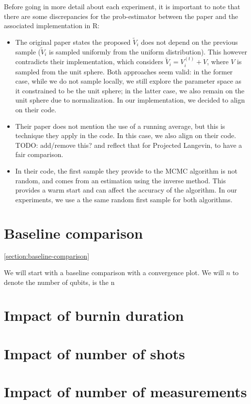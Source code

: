 \documentclass[12pt]{memoir}
\begin{document}
Before going in more detail about each experiment, it is important to note that there are some discrepancies for the prob-estimator between the paper and the associated implementation in R:
\begin{itemize}
\item The original paper states the proposed $\tilde V_i$ does not depend on the previous sample ($\tilde V_i$ is sampled uniformly from the uniform distribution). This however contradicts their implementation, which considers $\tilde V_i = V_i^{(t)} + V$, where $V$ is sampled from the unit sphere. Both approaches seem valid: in the former case, while we do not sample locally, we still explore the parameter space as it constrained to be the unit sphere; in the latter case, we also remain on the unit sphere due to normalization. In our implementation, we decided to align on their code.
\item Their paper does not mention the use of a running average, but this is technique they apply in the code. In this case, we also align on their code. TODO: add/remove this? and reflect that for Projected Langevin, to have a fair comparison.
\item In their code, the first sample they provide to the MCMC algorithm is not random, and comes from an estimation using the inverse method. This provides a warm start and can affect the accuracy of the algorithm. In our experiments, we use a the same random first sample for both algorithms. 
\end{itemize}

\section{Baseline comparison}\ref{section:baseline-comparison}

We will start with a baseline comparison with a convergence plot. We will $n$ to denote the number of qubits,  is the n

\section{Impact of burnin duration}

\section{Impact of number of shots}

\section{Impact of number of measurements}
\end{document}
